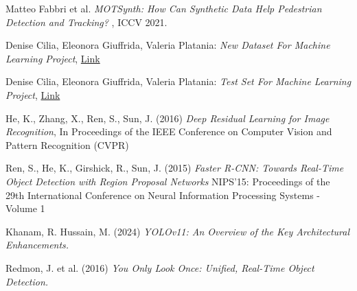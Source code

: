 \documentclass[12pt]{article}
\begin{document}
\begin{thebibliography}{9}

Matteo Fabbri et al. 
\textit{MOTSynth: How Can Synthetic Data Help Pedestrian Detection and Tracking?
},
ICCV 2021.

Denise Cilia, Eleonora Giuffrida, Valeria Platania:
\textit{New Dataset For Machine Learning Project},
\href{https://app.roboflow.com/test-hqhgt/new-dataset-for-ml-project/5}{Link}

Denise Cilia, Eleonora Giuffrida, Valeria Platania:
\textit{Test Set For Machine Learning Project},
\href{https://app.roboflow.com/test-hqhgt/test-set-for-ml-project/1}{Link}

He, K., Zhang, X., Ren, S., Sun, J. (2016)
\textit{Deep Residual Learning for Image Recognition},
In Proceedings of the IEEE Conference on Computer Vision and Pattern Recognition (CVPR)

Ren, S., He, K., Girshick, R., Sun, J. (2015)
\textit{Faster R-CNN: Towards Real-Time Object Detection with Region Proposal Networks}
NIPS'15: Proceedings of the 29th International Conference on Neural Information Processing Systems - Volume 1

Khanam, R. Hussain, M. (2024) 
\textit{YOLOv11: An Overview of the Key Architectural Enhancements.}

Redmon, J. et al. (2016)
\textit{You Only Look Once: Unified, Real-Time Object Detection.}

\end{thebibliography}
\end{document}
